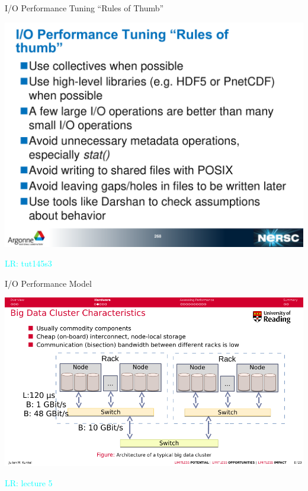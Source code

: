 \documentclass[compress,11pt,xcolor=svgnames,aspectratio=169]{beamer}
\newcommand{\lr}[1]{\textcolor{cyan}{LR: #1}}
\begin{document}
\begin{frame}[t]{I/O Performance Tuning ``Rules of Thumb''}

\begin{center}
\includegraphics[scale=0.35]{fig/io-rules}
\end{center}

\lr{tut145s3}

\end{frame}

\begin{frame}[t]{I/O Performance Model}

\begin{center}
\includegraphics[scale=0.7]{fig/5-1}
\end{center}

\lr{lecture 5}

\end{frame}
\end{document}
